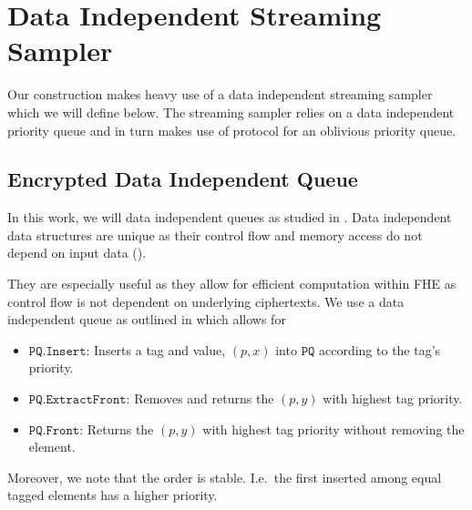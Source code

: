 \newcommand{\idealMSLE}{\mathcal{F}_{\text{MSLE}}}
\newcommand{\idealStreamSample}{\mathcal{F}_{\text{SAMPLE}}}
\newcommand{\hybrid}[1]{\mathrm{\textbf{Hyb}}_{#1}}
\newcommand{\eid}{{eid}}
\newcommand{\init}{\texttt{initialize}}
\newcommand{\register}{\texttt{register}}
\newcommand{\elect}{\texttt{elect}(\eid)}
\newcommand{\reveal}{\texttt{reveal}(\eid, \ell)}
\newcommand{\extractMin}{\texttt{ExtractMin}}
\newcommand{\getMin}{\texttt{GetMin}}
\newcommand{\ct}{\texttt{ct}}

\newcommand{\PQInsert}{\texttt{PQ.Insert}}
\newcommand{\PQExtract}{\texttt{PQ.ExtractFront}}
\newcommand{\PQFront}{\texttt{PQ.Front}}
\newcommand{\PQ}{\texttt{PQ}}

\newcommand{\EncPQInsert}{\texttt{EncPQ.Insert}}
\newcommand{\EncPQExtract}{\texttt{EncPQ.ExtractFront}}
\newcommand{\EncPQFront}{\texttt{EncPQ.Front}}


\newcommand{\EncPQ}{\texttt{EncPQ}}

\section{Data Independent Streaming Sampler}
\label{sec:streaming_sampler}
Our construction makes heavy use of a data independent streaming sampler which we will define below.
The streaming sampler relies on a data independent priority queue and in turn makes use of  protocol for an oblivious priority queue.

\subsection*{
	Encrypted Data Independent Queue
}
In this work, we will data independent queues as studied in \cite{toft2011secure, mitchell2014data, mazloom2023efficient}.
Data independent data structures are unique as their control flow and memory access do not depend on input data (\cite{mitchell2014data}).

They are especially useful as they allow for efficient computation within FHE as control flow is not dependent
on underlying ciphertexts. We use a data independent queue as outlined in \cite{mazloom2023efficient}
which allows for
\begin{itemize}
	\item $\PQInsert$: Inserts a tag and value, $(p, x)$ into $\PQ$ according to the tag's priority.
	\item $\PQExtract$: Removes and returns the $(p, y)$ with highest tag priority.
	\item $\PQFront$: Returns the $(p, y)$ with highest tag priority without removing the element.
\end{itemize}
Moreover, we note that the order is stable. I.e.\ the first inserted among equal tagged elements has a higher priority.

